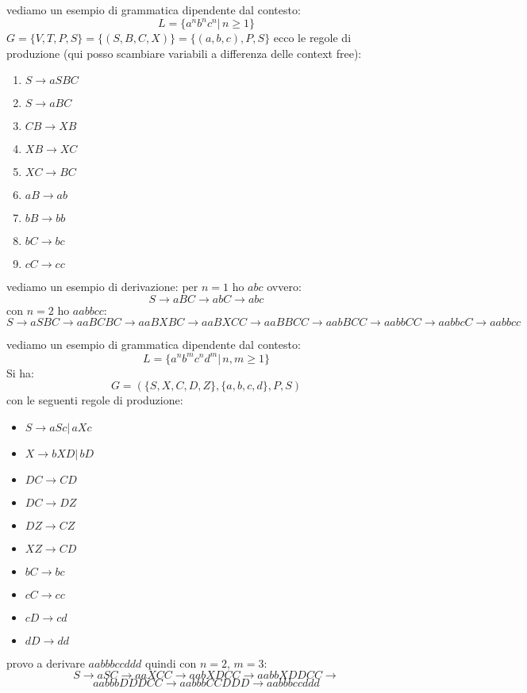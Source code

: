 \documentclass[a4paper,12pt, oneside]{book}
\begin{document}
\begin{esempio}
	vediamo un esempio di grammatica dipendente dal contesto:
	$$L=\{a^nb^nc^n|\, n\geq 1\}$$
	$G=\{V,T,P,S\}=\{(S,B,C,X)\}=\{(a,b,c),P,S\}$
	ecco le regole di produzione (qui posso scambiare variabili a differenza delle context free):
	\begin{enumerate}
		\item $S\to aSBC$
		\item $S\to aBC$
		\item $CB\to XB$
		\item $XB\to XC$
		\item $XC\to BC$
		\item $aB\to ab$
		\item $bB\to bb$
		\item $bC\to bc$
		\item $cC\to cc$
	\end{enumerate}
	vediamo un esempio di derivazione:
	per $n=1$ ho $abc$ ovvero:
	$$S\to aBC\to abC\to abc$$
	con $n=2$ ho $aabbcc$:
	$S\to aSBC\to aaBCBC\to aaBXBC\to aaBXCC\to aaBBCC\to aabBCC\to aabbCC\to aabbcC\to aabbcc$\\
\end{esempio}
\newpage
\begin{esempio}
	vediamo un esempio di grammatica dipendente dal contesto:
	$$L=\{a^nb^mc^nd^m|\, n,m\geq 1\}$$
	Si ha:
	$$G=(\{S,X,C,D,Z\},\{a,b,c,d\},P,S)$$
	con le seguenti regole di produzione:
	\begin{itemize}
		\item $S\to aSc|\, aXc$
		\item $X\to bXD|\, bD$
		\item $DC\to CD$
		\item $DC\to DZ$
		\item $DZ\to CZ$
		\item $XZ\to CD$
		\item $bC\to bc$
		\item $cC\to cc$
		\item $cD\to cd$
		\item $dD\to dd$
	\end{itemize}
	provo a derivare $aabbbccddd$ quindi con $n=2,\,m=3$:\\
	$$S\to aSC\to aaXCC\to aabXDCC\to aabbXDDCC\to $$
	$$aabbbDDDCC\to aabbbCCDDD\to aabbbccddd$$
\end{esempio}
\end{document}
